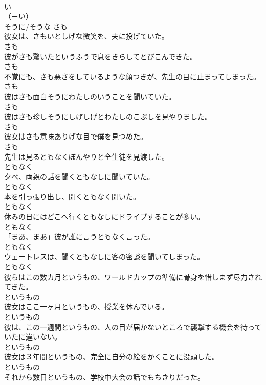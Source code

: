 \documentclass[8pt]{extreport}
\begin{document}
\begin{CJK}{UTF8}{min}
\\	い
\\	（－い） 
\\	そうに/そうな	さも	
\\	彼女は、さもいとしげな微笑を、夫に投げていた。	
\\	さも	
\\	彼がさも驚いたというふうで息をきらしてとびこんできた。	
\\	さも	
\\	不覚にも、さも悪さをしているような顔つきが、先生の目に止まってしまった。	
\\	さも	
\\	彼はさも面白そうにわたしのいうことを聞いていた。	
\\	さも	
\\	彼はさも珍しそうにしげしげとわたしのこぶしを見やりました。	
\\	さも	
\\	彼女はさも意味ありげな目で僕を見つめた。	
\\	さも	
\\	先生は見るともなくぼんやりと全生徒を見渡した。	
\\	ともなく	
\\	夕べ、両親の話を聞くともなしに聞いていた。	
\\	ともなく	
\\	本を引っ張り出し、開くともなく開いた。	
\\	ともなく	
\\	休みの日にはどこへ行くともなしにドライブすることが多い。	
\\	ともなく	
\\	「まあ、まあ」彼が誰に言うともなく言った。	
\\	ともなく	
\\	ウェートレスは、聞くともなしに客の密談を聞いてしまった。	
\\	ともなく	
\\	彼らはこの数カ月というもの、ワールドカップの準備に骨身を惜しまず尽力されてきた。	
\\	というもの	
\\	彼女はここ一ヶ月というもの、授業を休んでいる。	
\\	というもの	
\\	彼は、この一週間というもの、人の目が届かないところで襲撃する機会を待っていたに違いない。	
\\	というもの	
\\	彼女は３年間というもの、完全に自分の絵をかくことに没頭した。	
\\	というもの	
\\	それから数日というもの、学校中大会の話でもちきりだった。	

\end{CJK}
\end{document}
